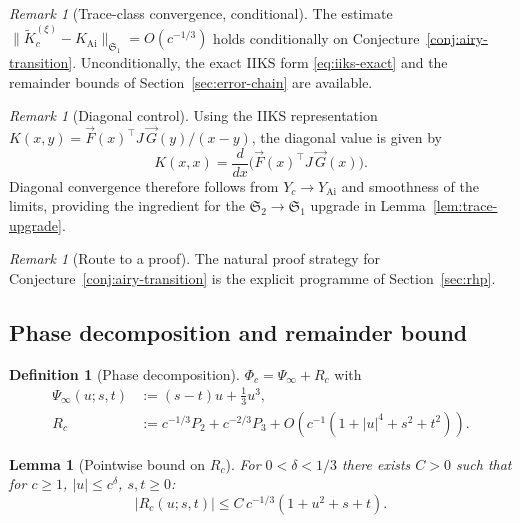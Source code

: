 \documentclass[12pt,a4paper]{amsart}
\newtheorem{lemma}[theorem]{Lemma}
\theoremstyle{definition}
\newtheorem{definition}[theorem]{Definition}
\theoremstyle{remark}
\newtheorem{remark}[theorem]{Remark}
\newcommand{\norm}[1]{\|#1\|}
\begin{document}
\begin{remark}[Trace-class convergence, conditional]
\label{rem:tc-conditional}
The estimate
$\norm{\widetilde{K}_c^{(\xi)}-K_{\mathrm{Ai}}}_{\mathfrak{S}_1}=O(c^{-1/3})$
holds conditionally on Conjecture~\ref{conj:airy-transition}.
Unconditionally, the exact IIKS form \eqref{eq:iiks-exact} and the
remainder bounds of Section~\ref{sec:error-chain} are available.
\end{remark}

\begin{remark}[Diagonal control]
\label{rem:diagonal-control}
Using the IIKS representation $K(x,y)=\vec{F}(x)^\top J\,\vec{G}(y)/(x-y)$,
the diagonal value is given by
\[
  K(x,x)=\frac{d}{dx}\bigl(\vec{F}(x)^\top J\,\vec{G}(x)\bigr).
\]
Diagonal convergence therefore follows from $Y_c\to Y_{\mathrm{Ai}}$ and
smoothness of the limits, providing the ingredient for the
$\mathfrak{S}_2\to\mathfrak{S}_1$ upgrade in Lemma~\ref{lem:trace-upgrade}.
\end{remark}

\begin{remark}[Route to a proof]
\label{rem:rh-route}
The natural proof strategy for Conjecture~\ref{conj:airy-transition}
is the explicit programme of Section~\ref{sec:rhp}.
\end{remark}

\subsection{Phase decomposition and remainder bound}

\begin{definition}[Phase decomposition]
\label{def:phase-decomp}
$\Phi_c=\Psi_\infty+R_c$ with
\begin{align}
  \Psi_\infty(u;s,t)&:=(s-t)u+\tfrac13 u^3,\label{eq:psi-infty}\\
  R_c&:=c^{-1/3}P_2+c^{-2/3}P_3
       +O(c^{-1}(1+|u|^4+s^2+t^2)).\label{eq:Rc-def}
\end{align}
\end{definition}

\begin{lemma}[Pointwise bound on $R_c$]
\label{lem:Rc-bound}
For $0<\delta<1/3$ there exists $C>0$ such that for $c\ge 1$,
$|u|\le c^\delta$, $s,t\ge 0$:
\begin{equation}\label{eq:Rc-pointwise}
  |R_c(u;s,t)|\le C\,c^{-1/3}(1+u^2+s+t).
\end{equation}
\end{lemma}
\end{document}
